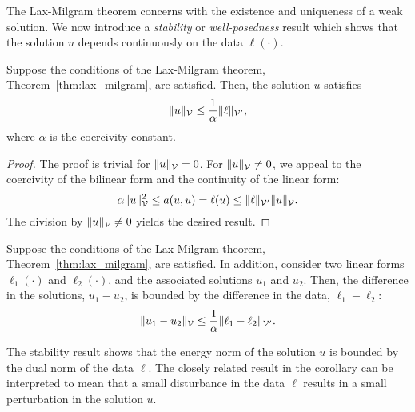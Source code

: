The Lax-Milgram theorem concerns with the existence and uniqueness of a weak solution.  We now introduce a \emph{stability} or \emph{well-posedness} result which shows that the solution $u$ depends continuously on the data $\ell(\cdot)$.
\begin{proposition}[stability]
  Suppose the conditions of the Lax-Milgram theorem, Theorem~\ref{thm:lax_milgram}, are satisfied. Then, the solution $u$ satisfies
  \begin{equation*}
    \| u \|_{\mathcal{V}} \leq \frac{1}{\alpha} \| \ell \|_{\mathcal{V}'},
  \end{equation*}
  where $\alpha$ is the coercivity constant.
  \begin{proof}
    The proof is trivial for $\| u \|_{\mathcal{V}} = 0$. For $\| u \|_{\mathcal{V}} \neq 0$, we appeal to the coercivity of the bilinear form and the continuity of the linear form:
    \begin{equation*}
      \alpha \| u \|_{\mathcal{V}}^2 \leq a(u,u) = \ell(u) \leq \| \ell \|_{\mathcal{V}'} \| u \|_{\mathcal{V}}.
    \end{equation*}
    The division by $\| u \|_{\mathcal{V}} \neq 0$ yields the desired result.
  \end{proof}
\end{proposition}
\begin{corollary}
  Suppose the conditions of the Lax-Milgram theorem, Theorem~\ref{thm:lax_milgram}, are satisfied.  In addition, consider two linear forms $\ell_1(\cdot)$ and $\ell_2(\cdot)$, and the associated solutions $u_1$ and $u_2$.  Then, the difference in the solutions, $u_1 - u_2$, is bounded by the difference in the data, $\ell_1 - \ell_2$:
  \begin{equation*}
    \| u_1 - u_2 \|_{\mathcal{V}} \leq \frac{1}{\alpha} \| \ell_1 - \ell_2 \|_{\mathcal{V}'}.
  \end{equation*}
\end{corollary}
The stability result shows that the energy norm of the solution $u$ is bounded by the dual norm of the data $\ell$.  The closely related result in the corollary can be interpreted to mean that a small disturbance in the data $\ell$ results in a small perturbation in the solution $u$.


